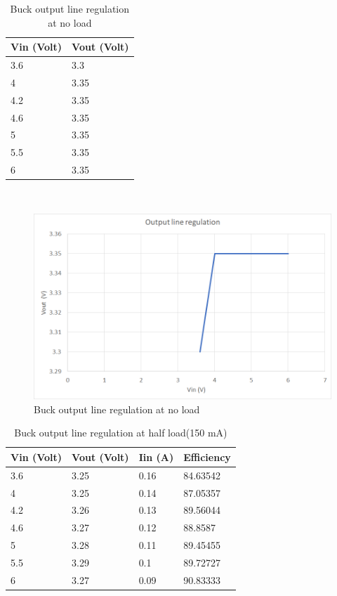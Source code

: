 \begin{table}[H]
\centering
\begin{tabular}{|l|l|}
\hline
Vin (Volt) & Vout (Volt) \\ \hline
3.6        & 3.3         \\ \hline
4          & 3.35        \\ \hline
4.2        & 3.35        \\ \hline
4.6        & 3.35        \\ \hline
5          & 3.35        \\ \hline
5.5        & 3.35        \\ \hline
6          & 3.35        \\ \hline
\end{tabular}
\caption{Buck output line regulation at no load}
\label{table:4}
\end{table}
\\
\begin{figure}[H]
	\centering
	\includegraphics[width=\columnwidth]{IMGS/Buck line regulation at no load.png}
	\caption{Buck output line regulation at no load}
	\label{fig:arch}
\end{figure}
\begin{table}[H]
\centering
\begin{tabular}{|l|l|l|l|}
\hline
Vin (Volt) & Vout (Volt) & Iin (A) & Efficiency \\ \hline
3.6        & 3.25        & 0.16    & 84.63542   \\ \hline
4          & 3.25        & 0.14    & 87.05357   \\ \hline
4.2        & 3.26        & 0.13    & 89.56044   \\ \hline
4.6        & 3.27        & 0.12    & 88.8587    \\ \hline
5          & 3.28        & 0.11    & 89.45455   \\ \hline
5.5        & 3.29        & 0.1     & 89.72727   \\ \hline
6          & 3.27        & 0.09    & 90.83333   \\ \hline
\end{tabular}
\caption{Buck output line regulation at half load(150 mA)}
\label{table:4}
\end{table}
